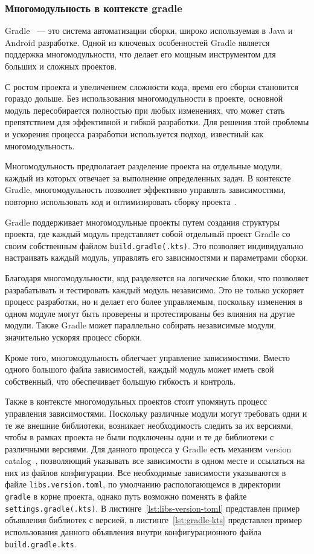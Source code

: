 \documentclass[14pt, russian]{scrartcl}
\begin{document}
\subsubsection{Многомодульность в контексте gradle}\label{sect:multimodule}

Gradle~\cite{gradle} --- это система автоматизации сборки, широко используемая в Java и Android разработке. Одной из ключевых особенностей Gradle является поддержка многомодульности, что делает его мощным инструментом для больших и сложных проектов.

С ростом проекта и увеличением сложности кода, время его сборки становится гораздо дольше. Без использования многомодульности в проекте, основной модуль пересобирается полностью при любых изменениях, что может стать препятствием для эффективной и гибкой разработки. Для решения этой проблемы и ускорения процесса разработки используется подход, известный как многомодульность.

Многомодульность предполагает разделение проекта на отдельные модули, каждый из которых отвечает за выполнение определенных задач. В контексте Gradle, многомодульность позволяет эффективно управлять зависимостями, повторно использовать код и оптимизировать сборку проекта~\cite{multi-module}.

Gradle поддерживает многомодульные проекты путем создания структуры проекта, где каждый модуль представляет собой отдельный проект Gradle со своим собственным файлом \texttt{build.gradle(.kts)}. Это позволяет индивидуально настраивать каждый модуль, управлять его зависимостями и параметрами сборки.

Благодаря многомодульности, код разделяется на логические блоки, что позволяет разрабатывать и тестировать каждый модуль независимо. Это не только ускоряет процесс разработки, но и делает его более управляемым, поскольку изменения в одном модуле могут быть проверены и протестированы без влияния на другие модули. Также Gradle может параллельно собирать независимые модули, значительно ускоряя процесс сборки.

Кроме того, многомодульность облегчает управление зависимостями. Вместо одного большого файла зависимостей, каждый модуль может иметь свой собственный, что обеспечивает большую гибкость и контроль.

Также в контексте многомодульных проектов стоит упомянуть процесс управления зависимостями. Поскольку различные модули могут требовать одни и те же внешние библиотеки, возникает необходимость следить за их версиями, чтобы в рамках проекта не были подключены одни и те де библиотеки с различными версиями. Для данного процесса у Gradle есть механизм version catalog~\cite{version-catalog}, позволяющий указывать все зависимости в одном месте и ссылаться на них из файлов конфигурации. Все необходимые зависимости указываются в файле \texttt{libs.version.toml}, по умолчанию распологающемся в директории \texttt{gradle} в корне проекта, однако путь возможно поменять в файле \texttt{settings.gradle(.kts)}. В листинге~\ref{lst:libs-version-toml} представлен пример объявления библиотек с версией, в листинге~\ref{lst:gradle-kts} представлен пример использования данного объявления внутри конфигурационного файла \texttt{build.gradle.kts}.
\end{document}
